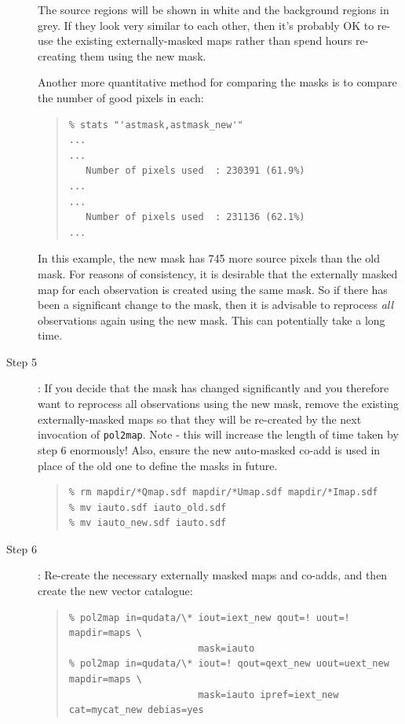 \documentclass[twoside,11pt]{starlink}
\begin{document}
\begin{description}
The source regions will be shown in white and the background regions in
grey. If they look very similar to each other, then it's probably OK to
re-use the existing externally-masked maps rather than spend hours
re-creating them using the new mask.

Another more quantitative method for comparing the masks is to compare the
number of good pixels in each:
\begin{quote}
\begin{verbatim}
% stats "'astmask,astmask_new'"
...
...
   Number of pixels used  : 230391 (61.9%)
...
...
   Number of pixels used  : 231136 (62.1%)
...
\end{verbatim}
\end{quote}

In this example, the new mask has 745 more source pixels than the old
mask. For reasons of consistency, it is desirable that the externally
masked map for each observation is created using the same mask. So if
there has been a significant change to the mask, then it is advisable
to reprocess \emph{all} observations again using the new mask.
This can potentially take a long time.

\item[Step 5]: If you decide that the mask has changed significantly and
you therefore want to reprocess all observations using the new mask,
remove the existing externally-masked maps so that they will be
re-created by the next invocation of \texttt{pol2map}. Note - this will
increase the length of time taken by step 6 enormously! Also, ensure the new
auto-masked co-add is used in place of the old one to define the masks
in future.
\begin{quote}
\begin{verbatim}
% rm mapdir/*Qmap.sdf mapdir/*Umap.sdf mapdir/*Imap.sdf
% mv iauto.sdf iauto_old.sdf
% mv iauto_new.sdf iauto.sdf
\end{verbatim}
\end{quote}

\item[Step 6]: Re-create the necessary externally masked maps and co-adds,
and then create the new vector catalogue:

\begin{quote}
\begin{verbatim}
% pol2map in=qudata/\* iout=iext_new qout=! uout=! mapdir=maps \
                       mask=iauto
% pol2map in=qudata/\* iout=! qout=qext_new uout=uext_new mapdir=maps \
                       mask=iauto ipref=iext_new cat=mycat_new debias=yes
\end{verbatim}
\end{quote}

\end{description}
\end{document}

